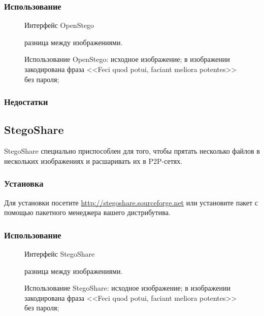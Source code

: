 \subsubsection{Использование}
\begin{figure}[h]
\caption{Интерфейс OpenStego}
\end{figure}
\begin{figure}[ht!]
\vspace{-4ex}
\centering
{}
\hspace{4ex}
\hspace{4ex}
\caption{Использование OpenStego:
 исходное изображение;
 в изображении закодирована фраза <<Feci quod potui, faciant meliora potentes>> без пароля;
} разница между изображениями.
\end{figure}
\subsubsection{Недостатки}
\subsection{StegoShare}
StegoShare специально приспособлен для того, чтобы прятать несколько файлов в нескольких изображениях и расшаривать их в P2P-сетях.
\subsubsection{Установка}
Для установки посетите \url{http://stegoshare.sourceforge.net} или установите пакет с помощью пакетного менеджера вашего дистрибутива.
\subsubsection{Использование}
\begin{figure}[h]
\caption{Интерфейс StegoShare}
\end{figure}
\begin{figure}[ht!]
\vspace{-4ex}
\centering
{}
\hspace{4ex}
\hspace{4ex}
\caption{Использование StegoShare:
 исходное изображение;
 в изображении закодирована фраза <<Feci quod potui, faciant meliora potentes>> без пароля;
} разница между изображениями.
\end{figure}
